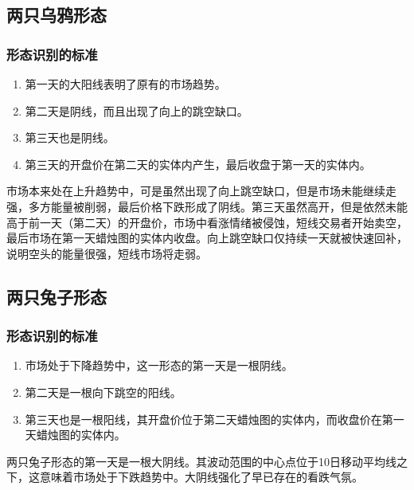 \subsection{两只乌鸦形态}
\subsubsection*{形态识别的标准}
\begin{enumerate}
    \item 第一天的大阳线表明了原有的市场趋势。
    \item 第二天是阴线，而且出现了向上的跳空缺口。
    \item 第三天也是阴线。
    \item 第三天的开盘价在第二天的实体内产生，最后收盘于第一天的实体内。
\end{enumerate}

市场本来处在上升趋势中，可是虽然出现了向上跳空缺口，但是市场未能继续走强，多方能量被削弱，最后价格下跌形成了阴线。第三天虽然高开，但是依然未能高于前一天（第二天）的开盘价，市场中看涨情绪被侵蚀，短线交易者开始卖空，最后市场在第一天蜡烛图的实体内收盘。向上跳空缺口仅持续一天就被快速回补，说明空头的能量很强，短线市场将走弱。
\subsection{两只兔子形态}
\subsubsection*{形态识别的标准}
\begin{enumerate}
    \item 市场处于下降趋势中，这一形态的第一天是一根阴线。
    \item 第二天是一根向下跳空的阳线。
    \item 第三天也是一根阳线，其开盘价位于第二天蜡烛图的实体内，而收盘价在第一天蜡烛图的实体内。
\end{enumerate}
两只兔子形态的第一天是一根大阴线。其波动范围的中心点位于10日移动平均线之下，这意味着市场处于下跌趋势中。大阴线强化了早已存在的看跌气氛。

